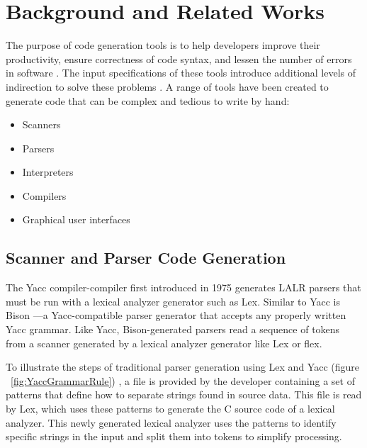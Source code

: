 \chapter{Background and Related Works}
The purpose of code generation tools is to help developers improve their productivity, ensure correctness of code syntax, and lessen the number of errors in software \cite{groher_01}.  The input specifications of these tools introduce additional levels of indirection to solve these problems \cite{spinellis_01}.  A range of tools have been created to generate code that can be complex and tedious to write by hand:
\begin{itemize}
  \item Scanners
  \item Parsers
  \item Interpreters
  \item Compilers
  \item Graphical user interfaces
\end{itemize}

\section{Scanner and Parser Code Generation}
The Yacc compiler-compiler \cite{johnson_01} first introduced in 1975 generates LALR parsers that must be run with a lexical analyzer generator such as Lex.  Similar to Yacc is Bison \cite{aycock_01,demaille_01}—a Yacc-compatible parser generator that accepts any properly written Yacc grammar.  Like Yacc, Bison-generated parsers read a sequence of tokens from a scanner generated by a lexical analyzer generator like Lex or flex.

\indent
To illustrate the steps of traditional parser generation using Lex and Yacc (figure ~\ref{fig:YaccGrammarRule}) \cite{johnson_01,lesk_01,niemann_01}, a file is provided by the developer containing a set of patterns that define how to separate strings found in source data.  This file is read by Lex, which uses these patterns to generate the C source code of a lexical analyzer.  This newly generated lexical analyzer uses the patterns to identify specific strings in the input and split them into tokens to simplify processing.

